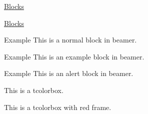 \documentclass[11pt,aspectratio=43,xcolor={dvipsnames},hyperref={pdftex,pdfpagemode=UseNone,hidelinks,pdfdisplaydoctitle=true},usepdftitle=false]{ctexbeamer}
\begin{document}
\begin{frame}{\underline{Blocks}}
  \itshape\lipsum[3]
\end{frame}

\begin{frame}{\underline{Blocks}}
  \begin{block}{Example}
    This is a normal block in beamer.
  \end{block}

  \begin{exampleblock}{Example}
    This is an example block in beamer.
  \end{exampleblock}

  \begin{alertblock}{Example}
    This is an alert block in beamer.
  \end{alertblock}

  \begin{tcolorbox}
    This is a tcolorbox.
  \end{tcolorbox}

  \begin{tcolorbox}[colframe=purple!70,colback=red!10]
    This is a tcolorbox with red frame.
  \end{tcolorbox}
\end{frame}
\end{document}

